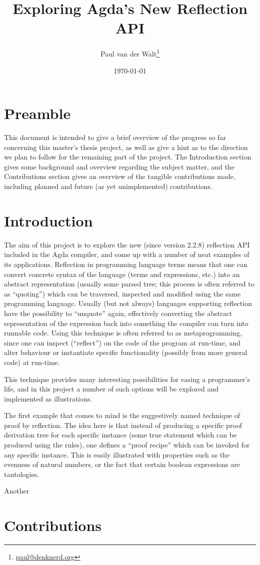 \documentclass[a4paper]{article}
\author{Paul van der Walt\footnote{\url{paul@denknerd.org}}}
\date{\today}
\title{Exploring Agda's New Reflection API}
\begin{document}
\maketitle


\section{Preamble}

This document is intended to give a brief overview of the progress so far concerning
this master's thesis project, as well as give a hint as to the direction we plan to follow
for the remaining part of the project. The Introduction section gives some background and
overview regarding the subject matter, and the Contributions section gives an overview of
the tangible contributions made, including planned and future (as yet unimplemented) contributions.



\section{Introduction}


The aim of this project is to explore the new (since version 2.2.8) reflection API included in the Agda
compiler, and come up with a number of neat examples of its applications. Reflection in programming language
terms means that one can convert concrete syntax of the language (terms and expressions, etc.) into an abstract
representation (usually some parsed tree; this process is often referred to as ``quoting'')
which can be traversed, inspected and modified using the same programming
language. Usually (but not always) languages supporting reflection have the possibility to
``unquote'' again, effectively
converting the abstract representation of the expression back into something the compiler
can turn into runnable code. Using this technique is often referred to as metaprogramming,
since one can inspect (``reflect'') on the code of the program at run-time, and alter behaviour
or instantiate specific functionality (possibly from more general code) at run-time.


This technique provides many interesting possibilities for easing a programmer's life, and in
this project a number of such options will be explored and implemented as illustrations.



The first example that comes to mind
is the suggestively named technique of proof by reflection. The idea here is that instead of producing a specific
proof derivation tree for each specific instance (some true statement which can be produced using the rules), one
defines a ``proof recipe'' which can be invoked for any specific instance. This is easily illustrated with properties
such as the evenness of natural numbers, or the fact that certain boolean expressions are tautologies.

Another 


\section{Contributions}
\end{document}

